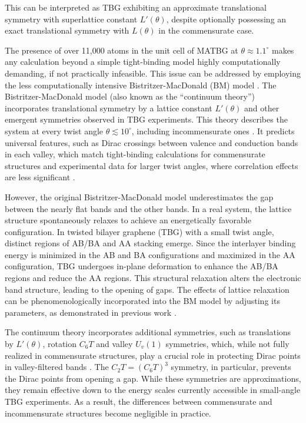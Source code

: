 This can be interpreted as TBG exhibiting an approximate translational symmetry with superlattice constant $L'(\theta)$, despite optionally possessing an exact translational symmetry with $L(\theta)$ in the commensurate case.

The presence of over 11,000 atoms in the unit cell of MATBG at \( \theta \approx 1.1^\circ \) makes any calculation beyond a simple tight-binding model highly computationally demanding, if not practically infeasible. This issue can be addressed by employing the less computationally intensive Bistritzer-MacDonald (BM) model \cite{macdonald2011}. The Bistritzer-MacDonald model (also known as the ``continuum theory'') incorporates translational symmetry by a lattice constant $L'(\theta)$ and other emergent symmetries observed in TBG experiments. This theory describes the system at every twist angle $\theta \lesssim 10^\circ$, including incommensurate ones \cite{continuum_model_castroneto2007, macdonald2011}. It predicts universal features, such as Dirac crossings between valence and conduction bands in each valley, which match tight-binding calculations for commensurate structures and experimental data for larger twist angles, where correlation effects are less significant \cite{zou2018}.

However, the original Bistritzer-MacDonald model underestimates the gap between the nearly flat bands and the other bands. In a real system, the lattice structure spontaneously relaxes to achieve an energetically favorable configuration. In twisted bilayer graphene (TBG) with a small twist angle, distinct regions of AB/BA and AA stacking emerge. Since the interlayer binding energy is minimized in the AB and BA configurations and maximized in the AA configuration, TBG undergoes in-plane deformation to enhance the AB/BA regions and reduce the AA regions. This structural relaxation alters the electronic band structure, leading to the opening of gaps. The effects of lattice relaxation can be phenomenologically incorporated into the BM model by adjusting its parameters, as demonstrated in previous work \cite{koshinohubbard2018}.

The continuum theory incorporates additional symmetries, such as translations by $L'(\theta)$, rotation \(C_6 T\) and valley \(U_v(1)\) symmetries, which, while not fully realized in commensurate structures, play a crucial role in protecting Dirac points in valley-filtered bands \cite{zou2018}. The \(C_2 T = (C_6 T)^3\) symmetry, in particular, prevents the Dirac points from opening a gap. While these symmetries are approximations, they remain effective down to the energy scales currently accessible in small-angle TBG experiments. As a result, the differences between commensurate and incommensurate structures become negligible in practice.

